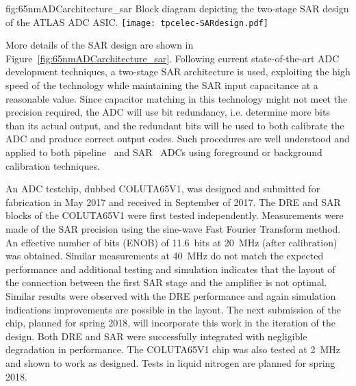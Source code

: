 \begin{dunefigure}
{fig:65nmADCarchitecture_sar}
{Block diagram depicting the two-stage SAR design of the ATLAS ADC ASIC.}
\texttt{[image: tpcelec-SARdesign.pdf]}
\end{dunefigure}

More details of the SAR design are shown in Figure~\ref{fig:65nmADCarchitecture_sar}. 
Following current state-of-the-art ADC development techniques, a two-stage 
SAR architecture is used, exploiting the high speed of the technology while maintaining the SAR input 
capacitance at a reasonable value. Since capacitor matching in this technology might not meet the 
precision required, the ADC will use bit redundancy, i.e. determine more bits than its actual output, 
and the redundant bits will be used to both calibrate the ADC and produce correct output codes. 
Such procedures are well understood and applied to both pipeline~\cite{Kuppambatti:2013nfa} and 
SAR~\cite{5999734} ADCs using foreground or background calibration techniques.

An ADC testchip, dubbed COLUTA65V1, was designed and submitted for fabrication in May 2017 and received
in September of 2017.  The DRE and SAR blocks of the COLUTA65V1 were first tested independently. Measurements were made
of the SAR precision using the sine-wave Fast Fourier Transform method. An effective number of bits
(ENOB) of \SI{11.6}{bits} at \SI{20}{MHz} (after calibration) was obtained.
Similar measurements at \SI{40}{MHz} do not match the expected performance and 
additional testing and simulation indicates that the layout of the connection between the first SAR stage and the amplifier is not optimal. Similar results were observed with
the DRE performance and again simulation indications improvements are possible in the layout. 
The next submission of the chip, planned for spring 2018, will incorporate this work in the iteration 
of the design. Both DRE and SAR were successfully integrated with negligible degradation in performance. The COLUTA65V1 chip was also tested at 2~MHz and shown to work as designed.  Tests in liquid nitrogen are planned for spring 2018.
